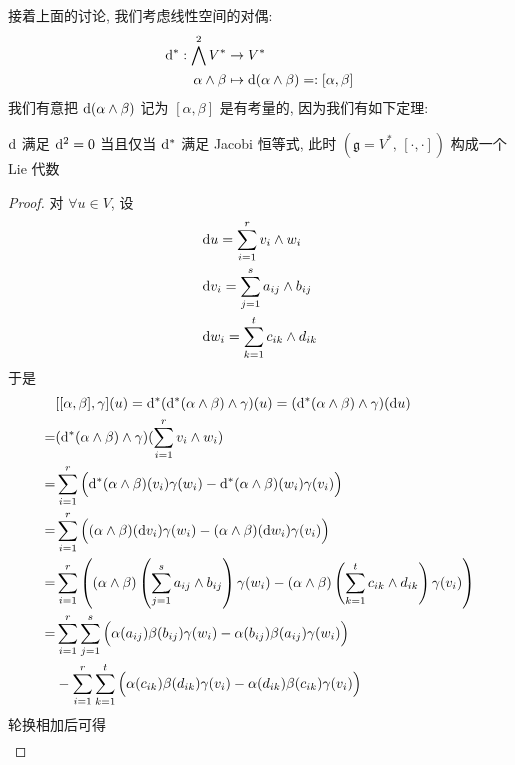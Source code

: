     接着上面的讨论, 我们考虑线性空间的对偶:
    \begin{align*}
        {\rm d}^*:\bigwedge^2V^*&\rightarrow V^*\\
        \alpha\wedge\beta&\mapsto {\rm d}(\alpha\wedge \beta)=:[\alpha,\beta]
    \end{align*}
    我们有意把 ${\rm d}(\alpha\wedge\beta)$ 记为 $[\alpha,\beta]$ 是有考量的, 因为我们有如下定理:
    \begin{theorem}\label{lie}
        ${\rm d}$ 满足 ${\rm d}^2 = 0$ 当且仅当 ${\rm d}^*$ 满足 {\rm Jacobi} 恒等式, 此时 $(\mathfrak{g} = V^*,\,[\cdot,\cdot])$ 构成一个 {\rm Lie} 代数
    \end{theorem}
    \begin{proof}
        对 $\forall u\in V$, 设 
        \begin{align*}
            &{\rm d} u=\sum\limits_{i=1}^{r}v_i\wedge w_i \\
            &{\rm d} v_i=\sum\limits_{j=1}^{s}a_{ij}\wedge b_{ij} \\
            &{\rm d} w_i=\sum\limits_{k=1}^{t}c_{ik}\wedge d_{ik}
        \end{align*}
        于是
        \begin{align*}
            &[[\alpha,\beta],\gamma](u) 
            = {\rm d}^*({\rm d}^*(\alpha\wedge\beta)\wedge\gamma)(u) 
            = ({\rm d}^*(\alpha\wedge\beta)\wedge\gamma)({\rm d} u) \\
            =&({\rm d}^*(\alpha\wedge\beta)\wedge\gamma)(\sum_{i=1}^{r}v_i\wedge w_i) \\
            =&\sum_{i=1}^{r}\Big({\rm d}^*(\alpha\wedge\beta)(v_i)\gamma(w_i)-{\rm d}^*(\alpha\wedge\beta)(w_i)\gamma(v_i)\Big) \\
            =&\sum_{i=1}^{r}\Big((\alpha\wedge\beta)({\rm d} v_i)\gamma(w_i)-(\alpha\wedge\beta)({\rm d} w_i)\gamma(v_i)\Big) \\
            =&\sum_{i=1}^{r}\left((\alpha\wedge\beta)\left(\sum_{j=1}^{s}a_{ij}\wedge b_{ij}\right)\gamma(w_i)-(\alpha\wedge\beta)\left(\sum_{k=1}^{t}c_{ik}\wedge d_{ik}\right)\gamma(v_i)\right) \\
            =&\sum_{i=1}^{r}\sum_{j=1}^{s}\Big(\alpha(a_{ij})\beta(b_{ij})\gamma(w_i)-\alpha(b_{ij})\beta(a_{ij})\gamma(w_i)\Big) \\
            &-\sum_{i=1}^{r}\sum_{k=1}^{t}\Big(\alpha(c_{ik})\beta(d_{ik})\gamma(v_i)-\alpha(d_{ik})\beta(c_{ik})\gamma(v_i)\Big) \\
        \end{align*}
        轮换相加后可得
        \begin{align*}

\end{align*}
\end{proof}
